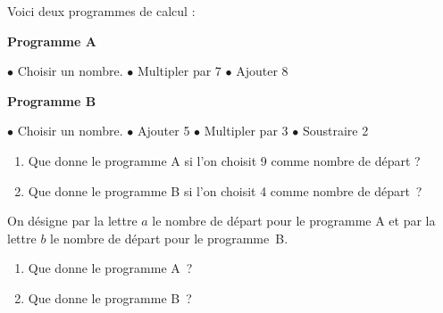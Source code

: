 \documentclass[exercice]{thedocument}%
\begin{document}
%
Voici deux programmes de calcul :\vskip10pt
{\centering\begin{minipage}[t]{120pt}
    \begin{mdframed}[
            backgroundcolor=blue!10!white,
            middlelinecolor=blue!50!black,
            roundcorner=5pt%
        ]
        {\color{blue!50!black}\centering\bfseries Programme A\par\vskip8pt}
        $\bullet$\hskip5pt Choisir un nombre.\vskip5pt
        $\bullet$\hskip5pt Multipler par 7\vskip5pt
        $\bullet$\hskip5pt Ajouter 8\vskip5pt
        \hbox{}
    \end{mdframed}
\end{minipage}\hskip50pt%
\begin{minipage}[t]{120pt}
    \begin{mdframed}[
        backgroundcolor=green!10!white,
        middlelinecolor=green!50!black,
        roundcorner=5pt%
    ]
        {\color{green!50!black}\centering\bfseries Programme B\par\vskip8pt}
        $\bullet$\hskip5pt Choisir un nombre.\vskip5pt
        $\bullet$\hskip5pt Ajouter 5\vskip5pt
        $\bullet$\hskip5pt Multipler par 3\vskip5pt
        $\bullet$\hskip5pt Soustraire 2
    \end{mdframed}
\end{minipage}
\par}\vskip10pt
\begin{enumerate}
    \item Que donne le programme A si l'on choisit 9 comme nombre
    de départ ?
    \item Que donne le programme B si l'on choisit 4 comme nombre de
    départ~?
\end{enumerate}
On désigne par la lettre $a$ le nombre de départ pour le programme A et par
la lettre $b$ le nombre de départ pour le programme~B.
\begin{enumerate}\setcounter{enumi}2
    \item Que donne le programme A~?
    \item Que donne le programme B~?
\end{enumerate}
\end{document}
